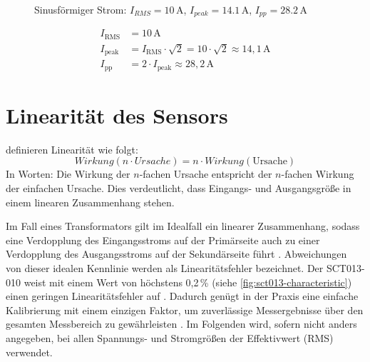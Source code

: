 	\begin{figure}[H]
		\centering
		\caption{Sinusförmiger Strom: $I_{RMS}=10\,\text{A}$, $I_{peak}=14.1\,\text{A}$, $I_{pp}=28.2\,\text{A}$}
		\label{fig:strom-rms}
	\end{figure}
		
	\begin{align}
		I_\text{RMS} &= 10\,\text{A} \\
		I_\text{peak} &= I_\text{RMS} \cdot \sqrt{2} = 10 \cdot \sqrt{2} \approx 14{,}1\,\text{A} \\
		I_\text{pp} &= 2 \cdot I_\text{peak} \approx 28{,}2\,\text{A}
	\end{align}

	
	
\section{Linearität des Sensors \label{sctLinearity}}
	\textcite{Stiny:2024} definieren Linearität wie folgt:
	\begin{equation}
		Wirkung (n \cdot Ursache) = n \cdot Wirkung (\text{Ursache})
	\end{equation}
	In Worten: Die Wirkung der $n$-fachen Ursache entspricht der $n$-fachen Wirkung der einfachen Ursache. Dies verdeutlicht, dass Eingangs- und Ausgangsgrö{\ss}e in einem linearen Zusammenhang stehen.
	
	Im Fall eines Transformators gilt im Idealfall ein linearer Zusammenhang, sodass eine Verdopplung des Eingangsstroms auf der Primärseite auch zu einer Verdopplung des Ausgangsstroms auf der Sekundärseite führt \cite[480--484]{Meier:2022}. Abweichungen von dieser idealen Kennlinie werden als Linearitätsfehler bezeichnet. Der SCT013-010 weist mit einem Wert von höchstens 0,2\,\% (siehe \autoref{fig:sct013-characteristic}) einen geringen Linearitätsfehler auf \cite{YHDC:2017}. Dadurch genügt in der Praxis eine einfache Kalibrierung mit einem einzigen Faktor, um zuverlässige Messergebnisse über den gesamten Messbereich zu gewährleisten \cite{Earl:2024}. Im Folgenden wird, sofern nicht anders angegeben, bei allen Spannungs- und Stromgrö{\ss}en der Effektivwert (RMS) verwendet.

